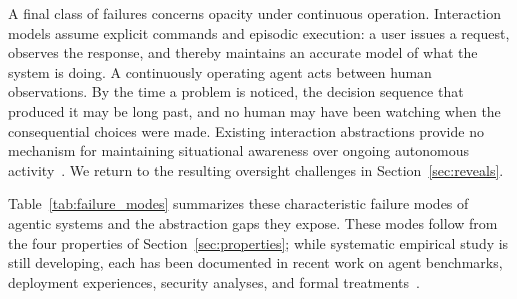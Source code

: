 \documentclass[11pt]{article}
\begin{document}
A final class of failures concerns opacity under continuous operation. Interaction models assume explicit commands and episodic execution: a user issues a request, observes the response, and thereby maintains an accurate model of what the system is doing. A continuously operating agent acts between human observations. By the time a problem is noticed, the decision sequence that produced it may be long past, and no human may have been watching when the consequential choices were made. Existing interaction abstractions provide no mechanism for maintaining situational awareness over ongoing autonomous activity~\cite{visibility_agents}. We return to the resulting oversight challenges in Section~\ref{sec:reveals}.

Table~\ref{tab:failure_modes} summarizes these characteristic failure modes of agentic systems and the abstraction gaps they expose. These modes follow from the four properties of Section~\ref{sec:properties}; while systematic empirical study is still developing, each has been documented in recent work on agent benchmarks, deployment experiences, security analyses, and formal treatments~\cite{swebench,kapoor_agents_matter,cemri_mas_fail,agent_contracts,visibility_agents,greshake_injection,anwar_alignment}.
\end{document}
